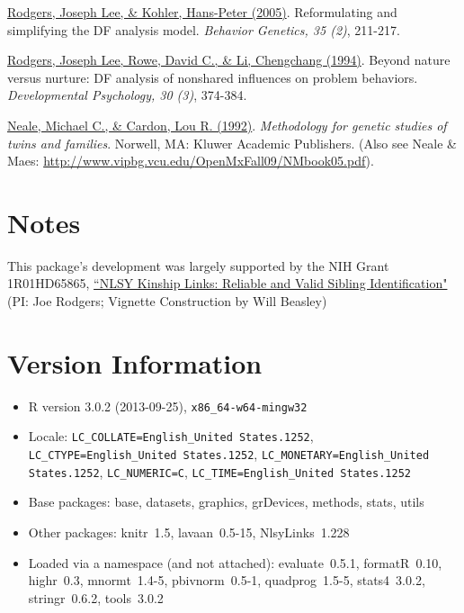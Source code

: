 \documentclass{article}\usepackage[]{graphicx}\usepackage[]{color}
\begin{document}
\href{http://www.springerlink.com/content/n3x1v1q282583366}{Rodgers, Joseph Lee, \& Kohler, Hans-Peter (2005)}. Reformulating and simplifying the DF analysis model. \emph{Behavior Genetics, 35 (2)}, 211-217.

\href{http://psycnet.apa.org/journals/dev/30/3/374/}{Rodgers, Joseph Lee, Rowe, David C., \& Li, Chengchang (1994)}. Beyond nature versus nurture: DF analysis of nonshared influences on problem behaviors. \emph{Developmental Psychology, 30 (3)}, 374-384. 

\href{http://books.google.com/books/about/Methodology_for_genetic_studies_of_twins.html?id=vVzDmDv6WDkC}{Neale, Michael C., \& Cardon, Lou R. (1992)}. \emph{Methodology for genetic studies of twins and families}. Norwell, MA: Kluwer Academic Publishers. (Also see Neale \& Maes: \url{http://www.vipbg.vcu.edu/OpenMxFall09/NMbook05.pdf}).
 
\section{Notes}
This package's development was largely supported by the NIH Grant 1R01HD65865, \href{http://taggs.hhs.gov/AwardDetail.cfm?s_Award_Num=R01HD065865&n_Prog_Office_Code=50}{``NLSY Kinship Links: Reliable and Valid Sibling Identification"} (PI: Joe Rodgers; Vignette Construction by Will Beasley)

\section{Version Information}
\begin{itemize}\raggedright
  \item R version 3.0.2 (2013-09-25), \verb|x86_64-w64-mingw32|
  \item Locale: \verb|LC_COLLATE=English_United States.1252|, \verb|LC_CTYPE=English_United States.1252|, \verb|LC_MONETARY=English_United States.1252|, \verb|LC_NUMERIC=C|, \verb|LC_TIME=English_United States.1252|
  \item Base packages: base, datasets, graphics, grDevices, methods, stats,
    utils
  \item Other packages: knitr~1.5, lavaan~0.5-15, NlsyLinks~1.228
  \item Loaded via a namespace (and not attached): evaluate~0.5.1,
    formatR~0.10, highr~0.3, mnormt~1.4-5, pbivnorm~0.5-1, quadprog~1.5-5,
    stats4~3.0.2, stringr~0.6.2, tools~3.0.2
\end{itemize}



\end{document}
